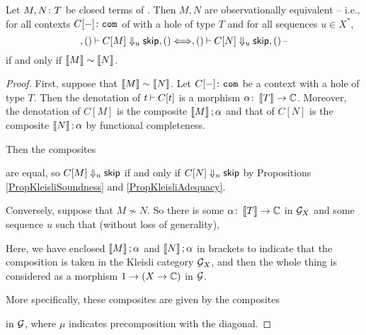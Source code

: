 \documentclass{article}
\begin{document}
\begin{theorem}
  Let $M,N\colon T$ be closed terms of \IAX.  
  Then $M,N$ are observationally equivalent -- i.e., for all contexts $C[-]\colon{\mathtt{com}}$ of \IAX with a hole of type $T$ and for all sequences $u\in X^*$, 
  \[
    ,()\mathbin{\vdash} C[M] \Downarrow_u {\mathsf{skip}},() \Longleftrightarrow ,()\mathbin{\vdash} C[N] \Downarrow_u {\mathsf{skip}},()\,\text{--}
    \]
  if and only if $\left\llbracket M\right\rrbracket\sim\left\llbracket N\right\rrbracket$.
  \label{TheKleisliFullAbstraction}
\end{theorem}
\begin{proof}
  First, suppose that $\left\llbracket M\right\rrbracket\sim\left\llbracket N\right\rrbracket$.  
  Let $C[-]\colon{\mathtt{com}}$ be a context with a hole of type $T$.  
  Then the denotation of $t\mathbin{\vdash} C[t]$ is a morphism $\alpha\colon \left\llbracket T\right\rrbracket \to \mathbb{C}$.
  Moreover, the denotation of $C[M]$ is the composite $\left\llbracket M\right\rrbracket;\alpha$ and that of $C[N]$ is the composite $\left\llbracket N\right\rrbracket;\alpha$ by functional completeness.

  Then the composites
  are equal, so $C[M]\Downarrow_u{\mathsf{skip}}$ if and only if $C[N]\Downarrow_u{\mathsf{skip}}$ by Propositions \ref{PropKleisliSoundness} and \ref{PropKleisliAdequacy}.

  Conversely, suppose that $M\not\sim N$.  
  So there is some $\alpha\colon \left\llbracket T\right\rrbracket \to \mathbb{C}$ in $\mathcal G_X$ and some sequence $u$ such that (without loss of generality),
  Here, we have enclosed $\left\llbracket M\right\rrbracket;\alpha$ and $\left\llbracket N\right\rrbracket;\alpha$ in brackets to indicate that the composition is taken in the Kleisli category $\mathcal G_X$, and then the whole thing is considered as a morphism $1 \to (X \to \mathbb{C})$ in $\mathcal G$.

  More specifically, these composites are given by the composites
  in $\mathcal G$, where $\mu$ indicates precomposition with the diagonal.


\end{proof}
\end{document}
